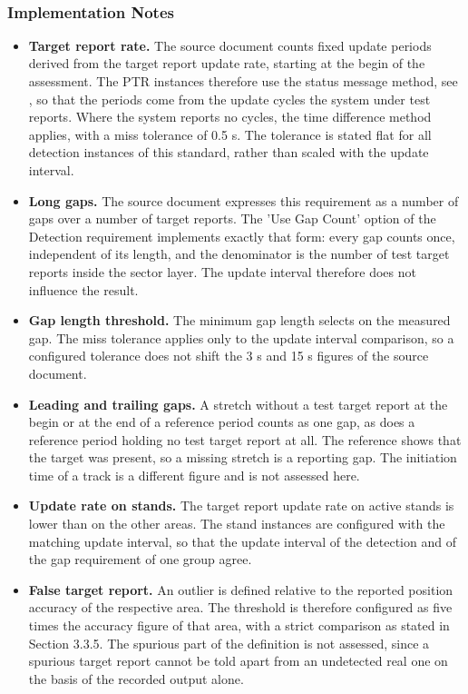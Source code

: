\ \\

\subsubsection{Implementation Notes}

\begin{itemize}
\item \textbf{Target report rate.} The source document counts fixed update periods derived from the target report update rate, starting at the begin of the assessment. The PTR instances therefore use the status message method, see , so that the periods come from the update cycles the system under test reports. Where the system reports no cycles, the time difference method applies, with a miss tolerance of 0.5 s. The tolerance is stated flat for all detection instances of this standard, rather than scaled with the update interval.
\item \textbf{Long gaps.} The source document expresses this requirement as a number of gaps over a number of target reports. The 'Use Gap Count' option of the Detection requirement implements exactly that form: every gap counts once, independent of its length, and the denominator is the number of test target reports inside the sector layer. The update interval therefore does not influence the result.
\item \textbf{Gap length threshold.} The minimum gap length selects on the measured gap. The miss tolerance applies only to the update interval comparison, so a configured tolerance does not shift the 3 s and 15 s figures of the source document.
\item \textbf{Leading and trailing gaps.} A stretch without a test target report at the begin or at the end of a reference period counts as one gap, as does a reference period holding no test target report at all. The reference shows that the target was present, so a missing stretch is a reporting gap. The initiation time of a track is a different figure and is not assessed here.
\item \textbf{Update rate on stands.} The target report update rate on active stands is lower than on the other areas. The stand instances are configured with the matching update interval, so that the update interval of the detection and of the gap requirement of one group agree.
\item \textbf{False target report.} An outlier is defined relative to the reported position accuracy of the respective area. The threshold is therefore configured as five times the accuracy figure of that area, with a strict comparison as stated in Section 3.3.5. The spurious part of the definition is not assessed, since a spurious target report cannot be told apart from an undetected real one on the basis of the recorded output alone.

\end{itemize}
